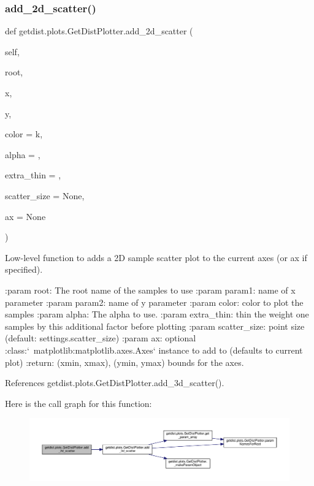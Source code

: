 \subsubsection{\texorpdfstring{add\+\_\+2d\+\_\+scatter()}{add\_2d\_scatter()}}
{\footnotesize\ttfamily def getdist.\+plots.\+Get\+Dist\+Plotter.\+add\+\_\+2d\+\_\+scatter (\begin{DoxyParamCaption}\item[{}]{self,  }\item[{}]{root,  }\item[{}]{x,  }\item[{}]{y,  }\item[{}]{color = {\ttfamily \textquotesingle{}k\textquotesingle{}},  }\item[{}]{alpha = {},  }\item[{}]{extra\+\_\+thin = {},  }\item[{}]{scatter\+\_\+size = {\ttfamily None},  }\item[{}]{ax = {\ttfamily None} }\end{DoxyParamCaption})}

\begin{DoxyVerb}Low-level function to adds a 2D sample scatter plot to the current axes (or ax if specified).

:param root: The root name of the samples to use
:param param1: name of x parameter
:param param2: name of y parameter
:param color: color to plot the samples
:param alpha: The alpha to use.
:param extra_thin: thin the weight one samples by this additional factor before plotting
:param scatter_size: point size (default: settings.scatter_size)
:param ax: optional :class:`~matplotlib:matplotlib.axes.Axes` instance to add to (defaults to current plot)
:return: (xmin, xmax), (ymin, ymax) bounds for the axes.
\end{DoxyVerb}
 

References getdist.\+plots.\+Get\+Dist\+Plotter.\+add\+\_\+3d\+\_\+scatter().

Here is the call graph for this function\+:
\nopagebreak
\begin{figure}[H]
\begin{center}
\leavevmode
\includegraphics[width=350pt]{classgetdist_1_1plots_1_1GetDistPlotter_a3f9f0b8a62a5e803e002da9b1c40e248_cgraph}
\end{center}
\end{figure}
\mbox{\label{classgetdist_1_1plots_1_1GetDistPlotter_a717cc70fba7ccf459cc880e6069f964b}} 

